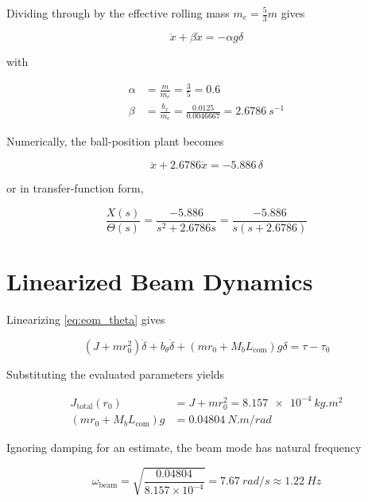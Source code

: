 Dividing through by the effective rolling mass $m_e = \tfrac{5}{3}m$ gives

\begin{equation}
  \ddot{x} + \beta \dot{x} = -\alpha g \delta
  \label{eq:linear_ball}
\end{equation}

with

\begin{align}
  \alpha &= \frac{m}{m_e} = \frac{3}{5} = 0.6 \\
  \beta &= \frac{b_x}{m_e} = \frac{0.0125}{0.0046667} = \SI{2.6786}{s^{-1}}
\end{align}

Numerically, the ball-position plant becomes

\begin{equation}
  \ddot{x} + 2.6786\dot{x} = -5.886\,\delta
\end{equation}

or in transfer-function form,

\begin{equation}
  \frac{X(s)}{\Theta(s)} =
  \frac{-5.886}{s^2 + 2.6786s}
  = \frac{-5.886}{s(s + 2.6786)}
\end{equation}

\section{Linearized Beam Dynamics}

Linearizing \eqref{eq:eom_theta} gives

\begin{equation}
  (J + mr_0^2)\ddot{\delta}
  + b_{\theta}\dot{\delta}
  + (mr_0 + M_bL_{\text{com}})g\delta
  = \tau - \tau_0
  \label{eq:linear_beam}
\end{equation}

Substituting the evaluated parameters yields

\begin{align}
  J_{\text{total}}(r_0)
    &= J + mr_0^2
     = \SI{8.157e-4}{kg.m^2} \\
  (mr_0 + M_bL_{\text{com}})g
    &= \SI{0.04804}{N.m/rad}
\end{align}

Ignoring damping for an estimate, the beam mode has natural frequency

\begin{equation}
  \omega_{\text{beam}}
  = \sqrt{\frac{0.04804}{8.157\times 10^{-4}}}
  = \SI{7.67}{rad/s}
  \approx \SI{1.22}{Hz}
\end{equation}

